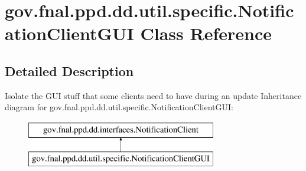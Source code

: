 \hypertarget{classgov_1_1fnal_1_1ppd_1_1dd_1_1util_1_1specific_1_1NotificationClientGUI}{\section{gov.\-fnal.\-ppd.\-dd.\-util.\-specific.\-Notification\-Client\-G\-U\-I Class Reference}
\label{classgov_1_1fnal_1_1ppd_1_1dd_1_1util_1_1specific_1_1NotificationClientGUI}
}


\subsection{Detailed Description}
Isolate the G\-U\-I stuff that some clients need to have during an update Inheritance diagram for gov.\-fnal.\-ppd.\-dd.\-util.\-specific.\-Notification\-Client\-G\-U\-I\-:\begin{figure}[H]
\begin{center}
\leavevmode
\includegraphics[height=2.000000cm]{classgov_1_1fnal_1_1ppd_1_1dd_1_1util_1_1specific_1_1NotificationClientGUI}
\end{center}
\end{figure}
